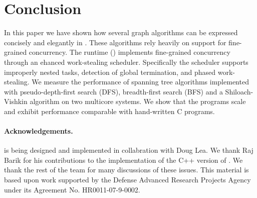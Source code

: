\section{Conclusion}\label{s:concl}

In this paper we have shown how several graph algorithms can be
expressed concisely and elegantly in \Xten. These algorithms rely
heavily on support for fine-grained concurrency. The \Xten{} runtime
(\XWS) implements fine-grained concurrency through an ehanced
work-stealing scheduler. Specifically the scheduler supports
improperly nested tasks, detection of global termination, and phased
work-stealing.  We measure the performance of spanning tree algorithms
implemented with pseudo-depth-first search (DFS), breadth-first search
(BFS) and a Shiloach-Vishkin algorithm on two multicore systems. We
show that the \XWS{} programs scale and exhibit performance comparable
with hand-written C programs.

\paragraph{Acknowledgements.} \XWS{} is being designed and implemented in collabration with Doug Lea. We thank Raj Barik for his contributions to the implementation of the C++ version of \XWS. We thank the rest of the \Xten{} team for many discussions of these issues. This material is based upon work supported by the Defense
Advanced Research Projects Agency under its Agreement No.
HR0011-07-9-0002.